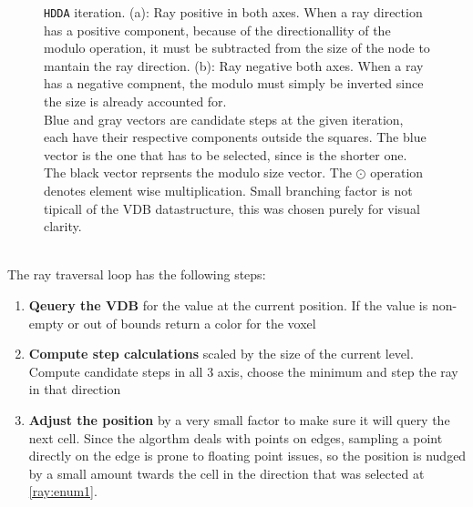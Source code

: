 \begin{figure}[H]
  \centering
  
  \caption{
    \texttt{HDDA} iteration. (a): Ray positive in both axes.
    When a ray direction has a positive component, because of the directionallity of the modulo operation, it must be subtracted from the size of the node to mantain the ray direction.
    (b): Ray negative both axes. When a ray has a negative compnent, the modulo must simply be inverted since the size is already accounted for. \\
    Blue and gray vectors are candidate steps at the given iteration, each have their respective components outside the squares.
    The blue vector is the one that has to be selected, since is the shorter one.
    The black vector reprsents the modulo size vector. The $\odot$ operation denotes element wise multiplication.
    Small branching factor is not tipicall of the VDB datastructure, this was chosen purely for visual clarity.
  }
  \label{hdda:fig}
\end{figure}

 \\
The ray traversal loop has the following steps:
\begin{enumerate}
  \item \textbf{Qeuery the VDB} for the value at the current position. If the value is non-empty or out of bounds return a color for the voxel
  \item\label{ray:enum1} \textbf{Compute step calculations} scaled by the size of the current level.
        Compute candidate steps in all 3 axis, choose the minimum and step the ray in that direction
  \item \textbf{Adjust the position} by a very small factor to make sure it will query the next cell.
        Since the algorthm deals with points on edges, sampling a point directly on the edge is prone to floating point issues,
        so the position is nudged by a small amount twards the cell in the direction that was selected at \cref{ray:enum1}.
\end{enumerate}


